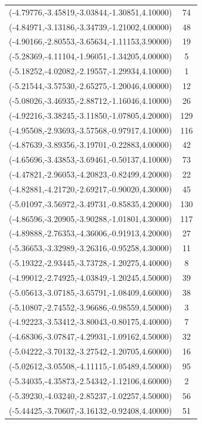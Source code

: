 \documentclass[12pt, fullpage,letterpaper]{article}
\begin{document}
\begin{longtable}{c|c}
(-4.79776,-3.45819,-3.03844,-1.30851,4.10000) & 74 \\
(-4.84971,-3.13186,-3.34739,-1.21002,4.00000) & 48 \\
(-4.90166,-2.80553,-3.65634,-1.11153,3.90000) & 19 \\
(-5.28369,-4.11104,-1.96051,-1.34205,4.00000) & 5 \\
(-5.18252,-4.02082,-2.19557,-1.29934,4.10000) & 1 \\
(-5.21544,-3.57530,-2.65275,-1.20046,4.00000) & 12 \\
(-5.08026,-3.46935,-2.88712,-1.16046,4.10000) & 26 \\
(-4.92216,-3.38245,-3.11850,-1.07805,4.20000) & 129 \\
(-4.95508,-2.93693,-3.57568,-0.97917,4.10000) & 116 \\
(-4.87639,-3.89356,-3.19701,-0.22883,4.00000) & 42 \\
(-4.65696,-3.43853,-3.69461,-0.50137,4.10000) & 73 \\
(-4.47821,-2.96053,-4.20823,-0.82499,4.20000) & 22 \\
(-4.82881,-4.21720,-2.69217,-0.90020,4.30000) & 45 \\
(-5.01097,-3.56972,-3.49731,-0.85835,4.20000) & 130 \\
(-4.86596,-3.20905,-3.90288,-1.01801,4.30000) & 117 \\
(-4.89888,-2.76353,-4.36006,-0.91913,4.20000) & 27 \\
(-5.36653,-3.32989,-3.26316,-0.95258,4.30000) & 11 \\
(-5.19322,-2.93445,-3.73728,-1.20275,4.40000) & 8 \\
(-4.99012,-2.74925,-4.03849,-1.20245,4.50000) & 39 \\
(-5.05613,-3.07185,-3.65791,-1.08409,4.60000) & 38 \\
(-5.10807,-2.74552,-3.96686,-0.98559,4.50000) & 3 \\
(-4.92223,-3.53412,-3.80043,-0.80175,4.40000) & 7 \\
(-4.68306,-3.07847,-4.29931,-1.09162,4.50000) & 32 \\
(-5.04222,-3.70132,-3.27542,-1.20705,4.60000) & 16 \\
(-5.02612,-3.05508,-4.11115,-1.05489,4.50000) & 95 \\
(-5.34035,-4.35873,-2.54342,-1.12106,4.60000) & 2 \\
(-5.39230,-4.03240,-2.85237,-1.02257,4.50000) & 56 \\
(-5.44425,-3.70607,-3.16132,-0.92408,4.40000) & 51 \\

\end{longtable}
\end{document}
